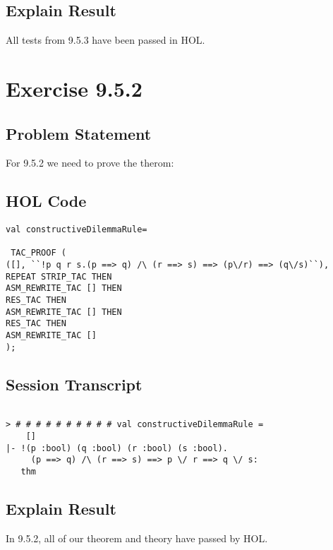 \documentclass{report}
\begin{document}
\section{Explain Result}
\label{explain result 953}
All tests from 9.5.3 have been passed in HOL.

\chapter{Exercise 9.5.2}
\label{ex 952}

\section{Problem Statement}
\label{problem state 952}
For 9.5.2 we need to prove the therom:


\section{HOL Code}
\label{HOl Code 952}

\begin{lstlisting}[frame=trBL]
val constructiveDilemmaRule=

 TAC_PROOF (
([], ``!p q r s.(p ==> q) /\ (r ==> s) ==> (p\/r) ==> (q\/s)``),
REPEAT STRIP_TAC THEN
ASM_REWRITE_TAC [] THEN
RES_TAC THEN
ASM_REWRITE_TAC [] THEN
RES_TAC THEN
ASM_REWRITE_TAC []
);

\end{lstlisting}

\section{Session Transcript}
\label{Session Trans 952}
\setcounter{sessioncount}{0}
\begin{session}
  \begin{scriptsize}
\begin{verbatim}

> # # # # # # # # # # val constructiveDilemmaRule =
    []
|- !(p :bool) (q :bool) (r :bool) (s :bool).
     (p ==> q) /\ (r ==> s) ==> p \/ r ==> q \/ s:
   thm
\end{verbatim}
  \end{scriptsize}
\end{session}
\section{Explain Result}
\label{explain result 952}
In 9.5.2, all of our theorem and theory have passed by HOL.
\end{document}

